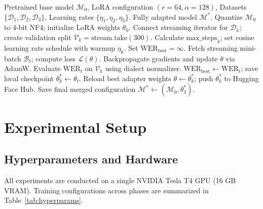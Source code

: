\documentclass[11pt,a4paper]{article}
\begin{document}
\begin{algorithm}[t]
\caption{Sequential Streaming Curriculum Training with Best-Adapter Preservation}
\label{alg:curriculum}
\small
\begin{algorithmic}[1]
\REQUIRE Pretrained base model $\mathcal{M}_0$, LoRA configuration $(r=64, \alpha=128)$, Datasets $\{\mathcal{D}_1, \mathcal{D}_2, \mathcal{D}_3\}$, Learning rates $\{\eta_1, \eta_2, \eta_3\}$.
\ENSURE Fully adapted model $\mathcal{M}^*$.
\STATE Quantize $\mathcal{M}_0$ to 4-bit NF4; initialize LoRA weights $\theta_0$.
    \STATE Connect streaming iterator for $\mathcal{D}_k$; create validation split $\mathcal{V}_k = \text{stream.take}(300)$.
    \STATE Calculate $\text{max\_steps}_k$; set cosine learning rate schedule with warmup $\eta_k$.
    \STATE Set $\text{WER}_{\text{best}} = \infty$.
        \STATE Fetch streaming mini-batch $\mathcal{B}_t$; compute loss $\mathcal{L}(\theta)$.
        \STATE Backpropagate gradients and update $\theta$ via AdamW.
            \STATE Evaluate $\text{WER}_t$ on $\mathcal{V}_k$ using dialect normalizer.
                \STATE $\text{WER}_{\text{best}} \leftarrow \text{WER}_t$; save local checkpoint $\theta_k^* \leftarrow \theta_t$.
            \ENDIF
        \ENDIF
    \ENDFOR
    \STATE Reload best adapter weights $\theta \leftarrow \theta_k^*$; push $\theta_k^*$ to Hugging Face Hub.
\ENDFOR
\STATE Save final merged configuration $\mathcal{M}^* \leftarrow (\mathcal{M}_0, \theta_3^*)$.
\end{algorithmic}
\end{algorithm}

\section{Experimental Setup}
\label{sec:experiments}

\subsection{Hyperparameters and Hardware}
All experiments are conducted on a single NVIDIA Tesla T4 GPU (16 GB VRAM). Training configurations across phases are summarized in Table~\ref{tab:hyperparams}.
\end{document}
